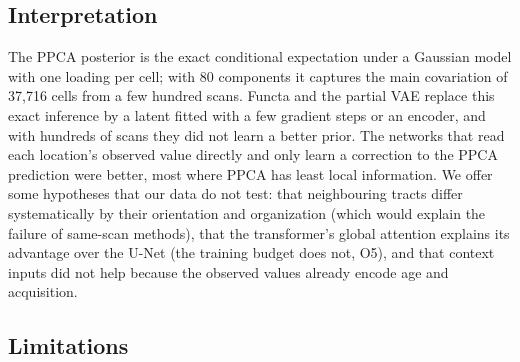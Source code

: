 \documentclass[11pt]{article}
\begin{document}
\subsection{Interpretation}

The PPCA posterior is the exact conditional expectation under a Gaussian model with one loading per cell; with 80
components it captures the main covariation of 37,716 cells from a few hundred scans. Functa and the partial VAE
replace this exact inference by a latent fitted with a few gradient steps or an encoder, and with hundreds of scans they
did not learn a better prior. The networks that read each location's observed value directly and only learn a
correction to the PPCA prediction were better, most where PPCA has least local information. We offer some hypotheses
that our data do not test: that neighbouring tracts differ systematically by their orientation and organization (which
would explain the failure of same-scan methods), that the transformer's global attention explains its advantage over the U-Net (the training budget does not, O5), and that context inputs did not help because the observed values already
encode age and acquisition.

\subsection{Limitations}
\end{document}
